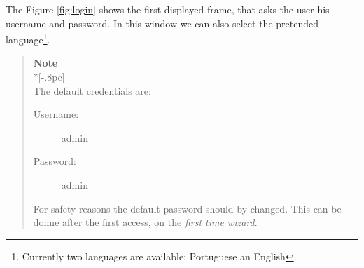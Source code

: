 
The Figure \ref{fig:login} shows the first displayed frame, that asks the user his username and password. In this window we can also select the pretended language\footnote{Currently two languages are available: Portuguese an English}.

\begin{quote}
	{\large \bf Note} \\*[-.8pc]
	\underline{\hspace{6in}} \\
    The default credentials are:
	\begin{description}
        	\item[Username:] admin
	        \item[Password:] admin
	\end{description}
    For safety reasons the default password should by changed. This can be donne after the first access, on the \textit{first time wizard}.

\end{quote}

